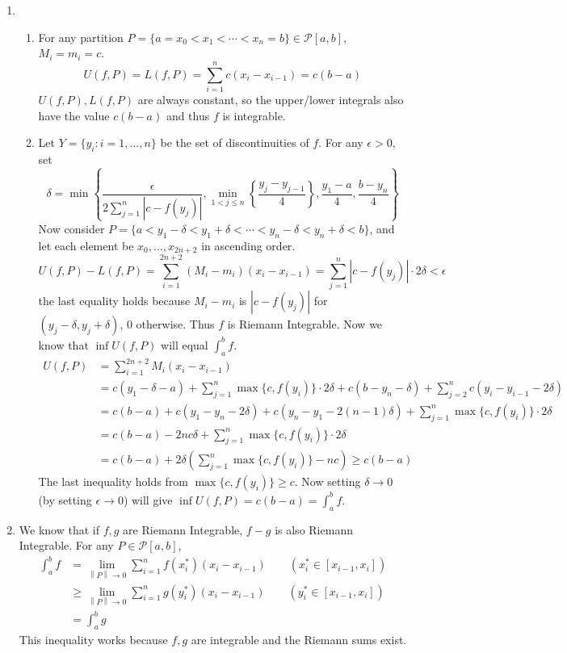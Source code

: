 \documentclass[11pt]{report}
\newcommand{\mc}[1]{\mathcal{#1}}
\newcommand{\norm}[1]{\left\lVert#1\right\rVert}
\newcommand{\ra}{\rightarrow}
\newcommand{\abs}[1]{\left|#1\right|}
\begin{document}
\begin{enumerate}
\item
\begin{enumerate}
	\item For any partition $P = \{a=x_0 < x_1<\cdots<x_n =b \} \in \mc{P}[a, b]$, $M_i = m_i =c$. $$U(f, P) = L(f, P) = \sum_{i=1}^n c(x_{i}-x_{i-1}) = c(b-a)$$
	$U(f, P), L(f, P)$ are always constant, so the upper/lower integrals also have the value $c(b-a)$ and thus $f$ is integrable.
	\item Let $Y = \{y_i : i = 1, \dots, n\}$ be the set of discontinuities of $f$. For any $\epsilon > 0$, set $$\delta = \min \left\{\frac{\epsilon}{2\sum_{j=1}^n \abs{c - f(y_j)}}, \min_{1< j\leq n}\left\{\frac{y_j-y_{j-1} }{4} \right\}, \frac{y_1-a}{4}, \frac{b-y_n}{4} \right\}$$
	Now consider $P = \{a < y_1 -\delta < y_1+\delta < \cdots < y_n-\delta < y_n+\delta < b \}$, and let each element be $x_0, \dots, x_{2n+2}$ in ascending order.
	$$U(f, P) - L(f, P) = \sum_{i=1}^{2n+2} (M_i - m_i)(x_i-x_{i-1}) = \sum_{j=1}^n \abs{c-f(y_j)} \cdot 2\delta < \epsilon$$
	the last equality holds because $M_i-m_i$ is $\abs{c - f(y_j)}$ for $(y_j-\delta, y_j+\delta)$, 0 otherwise.
	Thus $f$ is Riemann Integrable. Now we know that $\inf U(f, P)$ will equal $\int_a^b f$.
	$$\begin{aligned}
	U(f, P) &= \sum_{i=1}^{2n+2} M_i (x_i-x_{i-1}) \\&= c(y_1-\delta - a) + \sum_{j=1}^n \max\{c, f(y_i)\} \cdot 2\delta + c(b-y_n-\delta) + \sum_{j=2}^nc (y_i - y_{i-1}-2\delta)\\
	&=c(b-a) + c(y_1-y_n-2\delta) + c(y_n-y_1-2(n-1)\delta) + \sum_{j=1}^n \max\{c, f(y_i)\} \cdot 2\delta\\
	&=c(b-a) - 2nc\delta + \sum_{j=1}^n \max\{c, f(y_i)\} \cdot 2\delta \\&= c(b-a) + 2\delta \left( \sum_{j=1}^n \max\{c, f(y_i)\}- nc\right)\geq c(b-a)
	\end{aligned}$$
	The last inequality holds from $\max\{c, f(y_i)\} \geq c$. Now setting $\delta \ra 0$ (by setting $\epsilon \ra 0$) will give $\inf U(f, P) = c(b-a) = \int_a^b f$.
\end{enumerate}

\item We know that if $f, g$ are Riemann Integrable, $f-g$ is also Riemann Integrable. For any $P\in \mc{P}[a, b]$,
$$\begin{aligned}
	\int_a^b f &= \lim_{\norm{P}\ra0} \sum_{i=1}^n f(x_i^*)(x_i-x_{i-1}) \qquad (x_i^* \in [x_{i-1}, x_i]) \\
	&\geq \lim_{\norm{P}\ra0} \sum_{i=1}^n g(y_i^*)(x_i-x_{i-1}) \qquad (y_i^* \in [x_{i-1}, x_i])\\
	&= \int_a^b g
\end{aligned}
$$
This inequality works because $f, g$ are integrable and the Riemann sums exist.


\end{enumerate}
\end{document}
